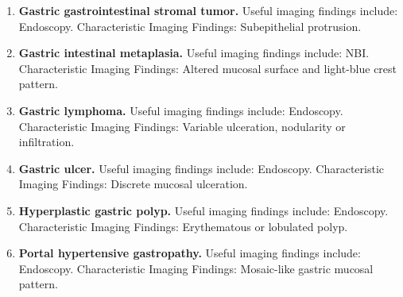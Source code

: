 \begin{enumerate}[leftmargin=*,itemsep=0.45em,topsep=0.4em]
\item \textbf{Gastric gastrointestinal stromal tumor.} Useful imaging findings include: Endoscopy. Characteristic Imaging Findings: Subepithelial protrusion.
\item \textbf{Gastric intestinal metaplasia.} Useful imaging findings include: NBI. Characteristic Imaging Findings: Altered mucosal surface and light-blue crest pattern.
\item \textbf{Gastric lymphoma.} Useful imaging findings include: Endoscopy. Characteristic Imaging Findings: Variable ulceration, nodularity or infiltration.
\item \textbf{Gastric ulcer.} Useful imaging findings include: Endoscopy. Characteristic Imaging Findings: Discrete mucosal ulceration.
\item \textbf{Hyperplastic gastric polyp.} Useful imaging findings include: Endoscopy. Characteristic Imaging Findings: Erythematous or lobulated polyp.
\item \textbf{Portal hypertensive gastropathy.} Useful imaging findings include: Endoscopy. Characteristic Imaging Findings: Mosaic-like gastric mucosal pattern.
\end{enumerate}

